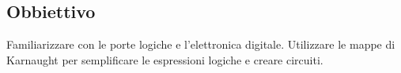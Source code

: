 \subsection{Obbiettivo}

Familiarizzare con le porte logiche e l'elettronica digitale. Utilizzare le
mappe di Karnaught per semplificare le espressioni logiche e creare circuiti.
